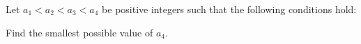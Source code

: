 Let $a_1 < a_2 < a_3 < a_4$ be positive integers such that the following conditions hold:

\begin{itemize}
\end{itemize}

Find the smallest possible value of $a_4$.
